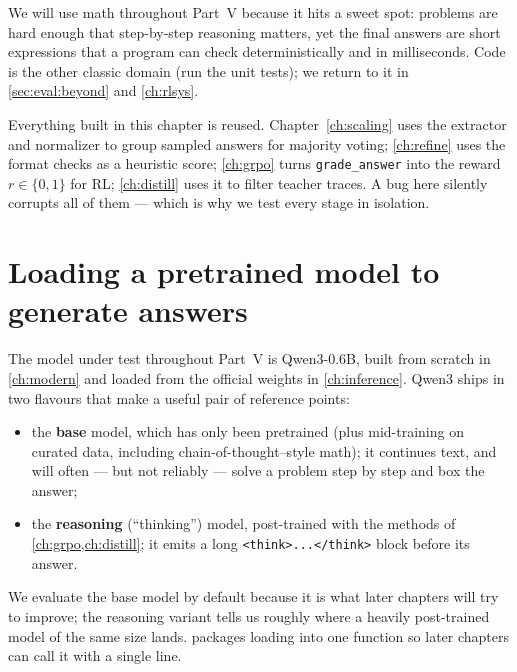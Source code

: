 We will use math throughout Part~V because it hits a sweet spot: problems are hard enough that
step-by-step reasoning matters, yet the final answers are short expressions that a program can
check deterministically and in milliseconds. Code is the other classic domain (run the unit
tests); we return to it in \cref{sec:eval:beyond} and \cref{ch:rlsys}.

\begin{keyidea}
Everything built in this chapter is reused. Chapter~\ref{ch:scaling} uses the extractor and
normalizer to group sampled answers for majority voting; \cref{ch:refine} uses the format
checks as a heuristic score; \cref{ch:grpo} turns \texttt{grade\_answer} into the reward
$r \in \{0,1\}$ for RL; \cref{ch:distill} uses it to filter teacher traces. A bug here
silently corrupts all of them --- which is why we test every stage in isolation.
\end{keyidea}

\section{Loading a pretrained model to generate answers}\label{sec:eval:load}

The model under test throughout Part~V is Qwen3-0.6B, built from scratch in \cref{ch:modern}
and loaded from the official weights in \cref{ch:inference}. Qwen3 ships in two flavours that
make a useful pair of reference points:

\begin{itemize}
  \item the \textbf{base} model, which has only been pretrained (plus mid-training on
  curated data, including chain-of-thought--style math); it continues text, and will often
  --- but not reliably --- solve a problem step by step and box the answer;
  \item the \textbf{reasoning} (``thinking'') model, post-trained with the methods of
  \cref{ch:grpo,ch:distill}; it emits a long \texttt{<think>...</think>} block before its answer.
\end{itemize}

We evaluate the base model by default because it is what later chapters will try to improve;
the reasoning variant tells us roughly where a heavily post-trained model of the same size lands.
 packages loading into one function so later chapters can call it with a
single line.

